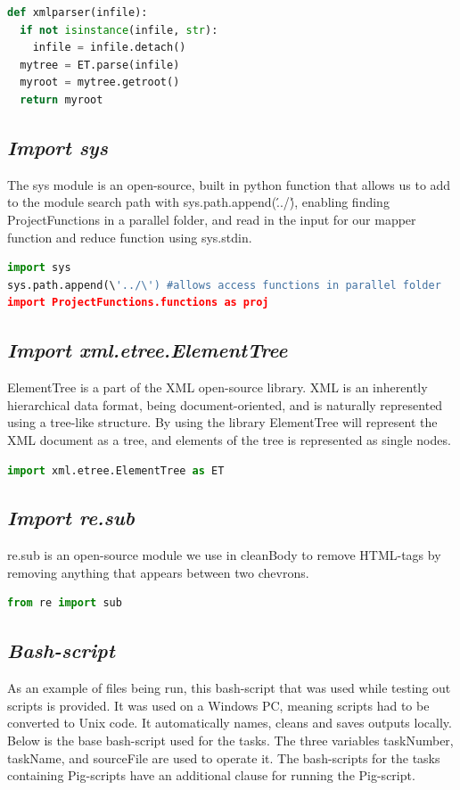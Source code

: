 \documentclass[fleqn,10pt]{wlscirep}
\begin{document}
\begin{lstlisting}[language=Python, caption=xmlparser function]
def xmlparser(infile):
  if not isinstance(infile, str):
    infile = infile.detach()
  mytree = ET.parse(infile)
  myroot = mytree.getroot()
  return myroot
\end{lstlisting}

\subsection{\emph{Import sys}}
The sys module is an open-source, built in python function that allows us to add to the module search path with sys.path.append(\'../\'), enabling finding ProjectFunctions in a parallel folder, and read in the input for our mapper function and reduce function using sys.stdin.
\begin{lstlisting}[language=Python, caption=Import for sys]
import sys
sys.path.append(\'../\') #allows access functions in parallel folder
import ProjectFunctions.functions as proj
\end{lstlisting}



\subsection{\emph{Import xml.etree.ElementTree}}
ElementTree is a part of the XML open-source library. XML is an inherently hierarchical data format, being document-oriented, and is naturally represented using a tree-like structure. By using the library ElementTree will represent the XML document as a tree, and elements of the tree is represented as single nodes. 
\begin{lstlisting}[language=Python, caption=Import for ElementTree]
import xml.etree.ElementTree as ET
\end{lstlisting}

\subsection{\emph{Import re.sub}}
re.sub is an open-source module we use in cleanBody to remove HTML-tags by removing anything that appears between two chevrons.
\begin{lstlisting}[language=Python, caption=Import for re.sub]
from re import sub
\end{lstlisting}

\subsection{\emph{Bash-script}}
As an example of files being run, this bash-script that was used while testing out scripts is provided. It was used on a Windows PC, meaning scripts had to be converted to Unix code. It automatically names, cleans and saves outputs locally. Below is the base bash-script used for the tasks. The three variables taskNumber, taskName, and sourceFile are used to operate it. The bash-scripts for the tasks containing Pig-scripts have an additional clause for running the Pig-script.

\end{document}
